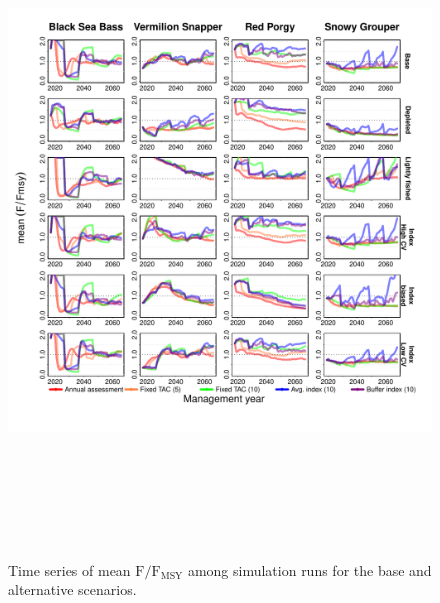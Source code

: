 \documentclass[12pt,english]{article}
\begin{document}
\begin{figure}[!ht]
\begin{center}
\includegraphics[width=6in,height=7in]{../Figs/tsFFmsy1.pdf}
\end{center}
\begin{flushleft}
\caption{Time series of mean $\mathrm{F/F_{MSY}}$ among simulation runs for the base and alternative scenarios. }
\label{fig:tsFFmsy1}
\end{flushleft}
\end{figure}
\end{document}
